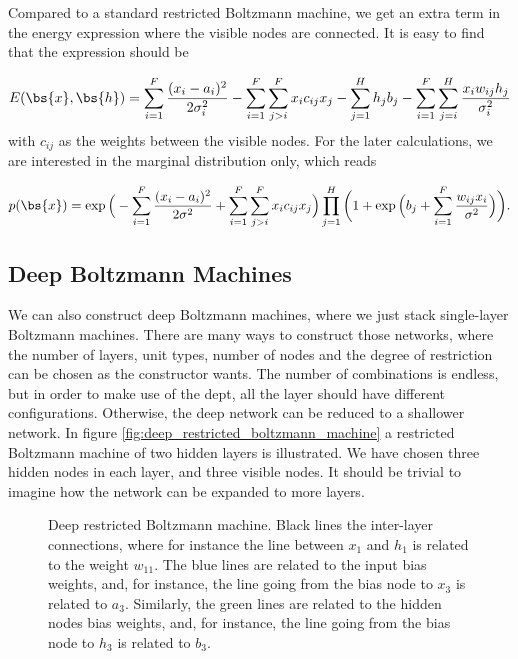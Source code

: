 Compared to a standard restricted Boltzmann machine, we get an extra term in the energy expression where the visible nodes are connected. It is easy to find that the expression should be

\begin{equation}
E(\bs{x},\bs{h})= \sum_{i=1}^F\frac{(x_i-a_i)^2}{2\sigma_i^2} - \sum_{i=1}^F\sum_{j>i}^Fx_ic_{ij}x_j- \sum_{j=1}^Hh_jb_j-\sum_{i=1}^F\sum_{j=i}^H \frac{x_iw_{ij}h_j}{\sigma_i^2} 
\label{eq:partlygaussianbinary}
\end{equation}
with $c_{ij}$ as the weights between the visible nodes. For the later calculations, we are interested in the marginal distribution only, which reads

\begin{equation}
p(\bs{x})=\exp\Big(-\sum_{i=1}^F\frac{(x_i-a_i)^2}{2\sigma^2}+\sum_{i=1}^F\sum_{j>i}^Fx_ic_{ij}x_j\Big)\prod_{j=1}^H\bigg(1+\exp\Big(b_j+\sum_{i=1}^F\frac{w_{ij}x_i}{\sigma^2}\Big)\bigg).
\label{eq:PNQSWF}
\end{equation}

\subsection{Deep Boltzmann Machines}
We can also construct deep Boltzmann machines, where we just stack single-layer Boltzmann machines. There are many ways to construct those networks, where the number of layers, unit types, number of nodes and the degree of restriction can be chosen as the constructor wants. The number of combinations is endless, but in order to make use of the dept, all the layer should have different configurations. Otherwise, the deep network can be reduced to a shallower network. In figure \eqref{fig:deep_restricted_boltzmann_machine} a restricted Boltzmann machine of two hidden layers is illustrated. We have chosen three hidden nodes in each layer, and three visible nodes. It should be trivial to imagine how the network can be expanded to more layers. 
\begin{figure} [H]
	\centering
	
	\caption{Deep restricted Boltzmann machine. Black lines the inter-layer connections, where for instance the line between $x_1$ and $h_1$ is related to the weight $w_{11}$. The blue lines are related to the input bias weights, and, for instance, the line going from the bias node to $x_3$ is related to $a_3$. Similarly, the green lines are related to the hidden nodes bias weights, and, for instance, the line going from the bias node to $h_3$ is related to $b_3$.}
	\label{fig:deep_restricted_boltzmann_machine}
\end{figure}

